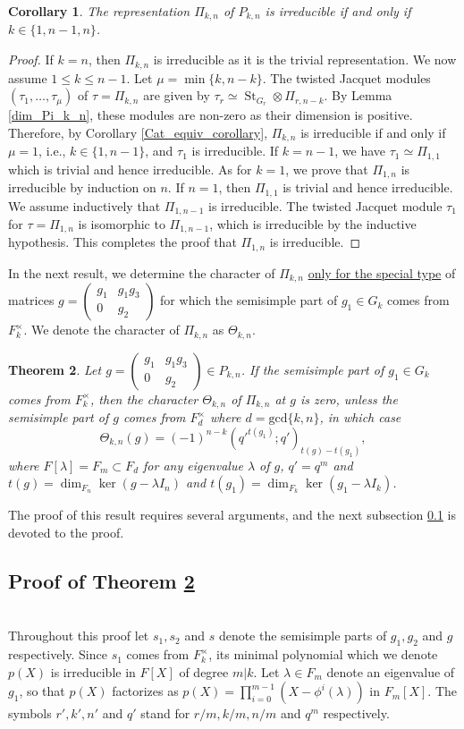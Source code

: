 \documentclass[reqno]{amsart}
\newtheorem{theorem}{Theorem}[section]
\newtheorem{corollary}[theorem]{Corollary}
\theoremstyle{definition}
\theoremstyle{remark}
\numberwithin{equation}{section}
\DeclareMathOperator{\St}{St}
\newcommand{\bbsm}{\left (\begin{smallmatrix}}      \newcommand{\besm}{\end{smallmatrix}\right )}
\begin{document}
\begin{corollary} \label{Pi_k_n_irreducibility}
    The representation $\Pi_{k,n}$ of $P_{k,n}$ is irreducible if and only if $k \in \{1,n-1,n\}$.
\end{corollary}
\begin{proof}
    If $k=n$, then $\Pi_{k,n}$ is irreducible as it is the trivial representation. We now assume $1 \leq k \leq n-1$. Let $\mu= \min\{k,n-k\}$. The twisted Jacquet modules $(\tau_1, \dots, \tau_\mu)$ of  $\tau=\Pi_{k,n}$ are given by  $\tau_r \simeq \St_{G_r} \otimes \Pi_{r,n-k}$. By Lemma \ref{dim_Pi_k_n}, these modules are non-zero as their dimension is positive. Therefore, by Corollary \ref{Cat_equiv_corollary}, $\Pi_{k,n}$ is irreducible if and only if  $\mu=1$, i.e., $k \in \{1, n-1\}$, and $\tau_1$ is irreducible. If $k=n-1$, we have $\tau_1 \simeq \Pi_{1,1}$ which is trivial and hence irreducible. As for $k=1$, we prove that $\Pi_{1,n}$ is irreducible by induction on $n$. If $n=1$, then $\Pi_{1,1}$ is trivial and hence irreducible. We assume inductively that $\Pi_{1,n-1}$ is irreducible. The twisted Jacquet module $\tau_1$ for $\tau=\Pi_{1,n}$ is isomorphic to $\Pi_{1,n-1}$, which is irreducible by the inductive hypothesis. This completes the proof that $\Pi_{1,n}$ is irreducible. 
\end{proof}


In the  next result,  we determine the character of $\Pi_{k,n}$ %
\underline{only for the special type} of matrices $g = \bbsm g_1 & g_1 g_3 \\ 0 & g_2 \besm$ for which the semisimple part of $g_1 \in G_k$ comes from $F_k^\times$. We denote the character of $\Pi_{k,n}$ as $\Theta_{k,n}$.
\begin{theorem} \label{Pi_k_n_char}
    Let  $g = \bbsm g_1 & g_1 g_3\\0& g_2 \besm \in P_{k,n}$. If the semisimple part of $g_1 \in G_k$   comes from $F_k^\times$, then the character $\Theta_{k,n}$ of $\Pi_{k,n}$ at $g$ is zero, unless the semisimple part of $g$ comes from $F_d^\times$ where $d = \text{gcd}\{k,n\}$, in which case
    \[\Theta_{k,n}(g)=(-1)^{n-k} ({q'}^{t(g_1)};q')_{t(g)-t(g_1)}, \]
    where $F[\lambda]=F_m \subset F_d$ for any eigenvalue $\lambda$ of $g$, $q'=q^m$ and $t(g)=\dim_{F_n}\ker(g-\lambda I_n)$ and $t(g_1)=\dim_{F_k}\ker(g_1-\lambda I_k)$.
\end{theorem} 
The proof of this result requires several arguments, and the next subsection \ref{sec_proof_Pi_k_n_char}  is devoted to the proof.
\subsection{Proof of Theorem \ref{Pi_k_n_char}}  \label{sec_proof_Pi_k_n_char} \hfill \\
Throughout this proof let $s_1, s_2$ and $s$ denote the semisimple parts of $g_1, g_2$ and $g$ respectively. Since $s_1$ comes from $F_k^\times$, its minimal polynomial which we denote $p(X)$ is irreducible in $F[X]$ of degree $m|k$. Let $\lambda \in F_m$ denote an eigenvalue of $g_1$, so that $p(X)$ factorizes as $p(X)=\prod_{i=0}^{m-1}(X-\phi^i(\lambda))$ in $F_m[X]$. The symbols $r',k', n'$ and $q'$ stand for $r/m,k/m, n/m$ and $q^m$ respectively. \\
\end{document}
